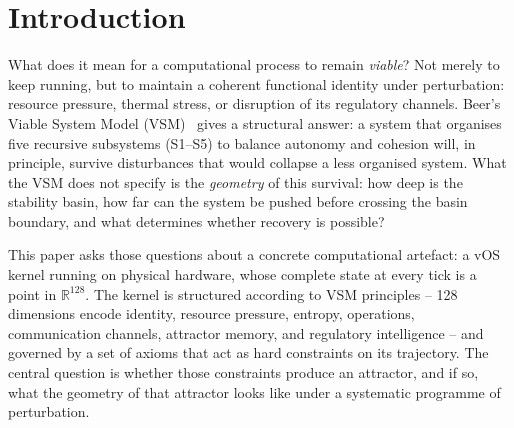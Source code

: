 \documentclass[11pt, a4paper]{article}
\newcommand{\R}{\mathbb{R}}
\newcommand{\vOS}{\textsf{vOS}}
\begin{document}
\begin{abstract}
Finally, we synthesise these measurements into a coordinate-free viability
functional $V = \min(g, c, t, m)$, built from intrinsic invariants (feasibility
in $\Omega$, contraction sign, topological signature, and noise margin).
On this kernel $g = 0.102$ (A3\_cpu, EXP-G-01) is the \emph{measured} binding
axis; EXP-VNC-01 confirms $V$ \emph{discriminates}: each axis independently
drives $V \to 0$ when broken, so the certificate is a vector, not a cosmetic
scalar. Because
$V$ and its underlying construction make no reference to the dimension $n = 128$,
they define a domain-agnostic transfer protocol --- choose a metric and feasible
region, certify a contraction, measure a margin --- which we apply here to the
numeric kernel and outline for two further modes, a language model and the agent
that governs it, as open objectives.
\end{abstract}

\tableofcontents
\newpage


\section{Introduction}
\label{sec:intro}

What does it mean for a computational process to remain \emph{viable}?
Not merely to keep running, but to maintain a coherent functional identity
under perturbation: resource pressure, thermal stress, or disruption of its
regulatory channels.
Beer's Viable System Model (VSM)~\cite{beer1972brain} gives a structural
answer: a system that organises five recursive subsystems (S1--S5) to
balance autonomy and cohesion will, in principle, survive disturbances that
would collapse a less organised system.
What the VSM does not specify is the \emph{geometry} of this survival:
how deep is the stability basin, how far can the system be pushed before
crossing the basin boundary, and what determines whether recovery is possible?

This paper asks those questions about a concrete computational artefact:
a \vOS{} kernel running on physical hardware, whose complete state at every
tick is a point in $\R^{128}$.
The kernel is structured according to VSM principles -- 128 dimensions
encode identity, resource pressure, entropy, operations, communication
channels, attractor memory, and regulatory intelligence -- and governed by
a set of axioms that act as hard constraints on its trajectory.
The central question is whether those constraints produce an attractor,
and if so, what the geometry of that attractor looks like under a
systematic programme of perturbation.
\end{document}
